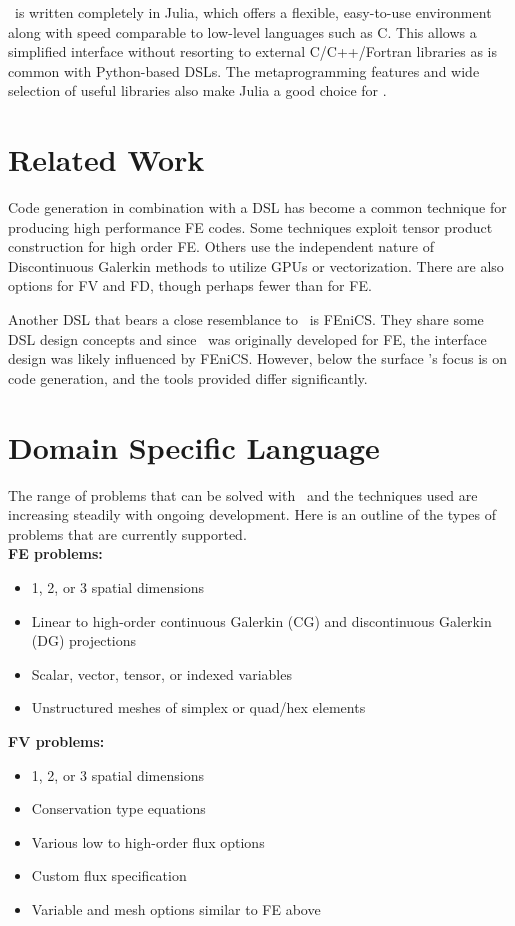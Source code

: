 \documentclass[twoside,leqno,twocolumn]{article}
\begin{document}
\FMshop\ is written completely in Julia, which offers a flexible, easy-to-use environment along with speed comparable to low-level languages such as C\cite{juliabench}. This allows a simplified interface without resorting to external C/C++/Fortran libraries as is common with Python-based DSLs. The metaprogramming features and wide selection of useful libraries also make Julia a good choice for \FMshop.

\section{Related Work}
Code generation in combination with a DSL has become a common technique for producing high performance FE codes. Some techniques exploit tensor product construction for high order FE\cite{yateto}\cite{mcrae}\cite{homolya}. Others use the independent nature of Discontinuous Galerkin methods to utilize GPUs\cite{seisol} or vectorization\cite{kempf}. There are also options for FV\cite{pietro} and FD\cite{macia}, though perhaps fewer than for FE.

Another DSL that bears a close resemblance to \FMshop\ is FEniCS. They share some DSL design concepts and since \FMshop\ was originally developed for FE, the interface design was likely influenced by FEniCS. However, below the surface \FMshop's focus is on code generation, and the tools provided differ significantly.

\section{Domain Specific Language}
The range of problems that can be solved with \FMshop\ and the techniques used are increasing steadily with ongoing development. Here is an outline of the types of problems that are currently supported.\\
\textbf{FE problems:}
\begin{itemize}
\item 1, 2, or 3 spatial dimensions
\item Linear to high-order continuous Galerkin (CG) and discontinuous Galerkin (DG) projections
\item Scalar, vector, tensor, or indexed variables
\item Unstructured meshes of simplex or quad/hex elements
\end{itemize}
\textbf{FV problems:}
\begin{itemize}
\item 1, 2, or 3 spatial dimensions
\item Conservation type equations
\item Various low to high-order flux options
\item Custom flux specification
\item Variable and mesh options similar to FE above
\end{itemize}
\end{document}
